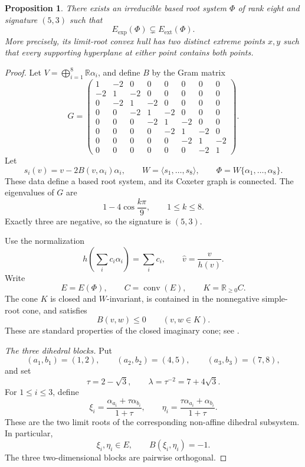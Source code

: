 \documentclass[11pt,reqno]{amsart}
\theoremstyle{plain}
\newtheorem{proposition}[theorem]{Proposition}
\theoremstyle{definition}
\theoremstyle{remark}
\numberwithin{equation}{section}
\begin{document}
\begin{proposition}\label{prop:nonexposed-extreme-limit-roots}
There exists an irreducible based root system $\Phi$ of rank eight
and signature $(5,3)$ such that
\[
E_{\mathrm{exp}}(\Phi)
\subsetneq E_{\mathrm{ext}}(\Phi).
\]
More precisely, its limit-root convex hull has two distinct
extreme points $x,y$ such that every supporting hyperplane at
either point contains both points.
\end{proposition}

\begin{proof}
Let $V=\bigoplus_{i=1}^{8}\mathbb R\alpha_i$,
and define $B$ by the Gram matrix
\[
G=
\begin{pmatrix}
1&-2&0&0&0&0&0&0\\
-2&1&-2&0&0&0&0&0\\
0&-2&1&-2&0&0&0&0\\
0&0&-2&1&-2&0&0&0\\
0&0&0&-2&1&-2&0&0\\
0&0&0&0&-2&1&-2&0\\
0&0&0&0&0&-2&1&-2\\
0&0&0&0&0&0&-2&1
\end{pmatrix}.
\]
Let
\[
s_i(v)=v-2B(v,\alpha_i)\alpha_i,
\qquad
W=\langle s_1,\ldots,s_8\rangle,
\qquad
\Phi=W\{\alpha_1,\ldots,\alpha_8\}.
\]
These data define a based root system, and its Coxeter graph
is connected.
The eigenvalues of $G$ are
\[
1-4\cos\frac{k\pi}{9},
\qquad 1\le k\le8.
\]
Exactly three are negative, so the signature is $(5,3)$.

Use the normalization
\[
h\left(\sum_i c_i\alpha_i\right)=\sum_i c_i,
\qquad
\widehat v=\frac{v}{h(v)}.
\]
Write
\[
E=E(\Phi),
\qquad
C=\operatorname{conv}(E),
\qquad
K=\mathbb R_{\ge0}C.
\]
The cone $K$ is closed and $W$-invariant, is contained in the
nonnegative simple-root cone, and satisfies
\[
B(v,w)\le0
\qquad(v,w\in K).
\]
These are standard properties of the closed imaginary cone;
see \cite[Section~2]{DHR}.

\medskip
\noindent\textit{The three dihedral blocks.}
Put
\[
(a_1,b_1)=(1,2),
\qquad
(a_2,b_2)=(4,5),
\qquad
(a_3,b_3)=(7,8),
\]
and set
\[
\tau=2-\sqrt3,
\qquad
\lambda=\tau^{-2}=7+4\sqrt3.
\]
For $1\le i\le3$, define
\[
\xi_i=
\frac{\alpha_{a_i}+\tau\alpha_{b_i}}{1+\tau},
\qquad
\eta_i=
\frac{\tau\alpha_{a_i}+\alpha_{b_i}}{1+\tau}.
\]
These are the two limit roots of the corresponding non-affine
dihedral subsystem. In particular,
\[
\xi_i,\eta_i\in E,
\qquad
B(\xi_i,\eta_i)=-1.
\]
The three two-dimensional blocks are pairwise orthogonal.


\end{proof}
\end{document}
